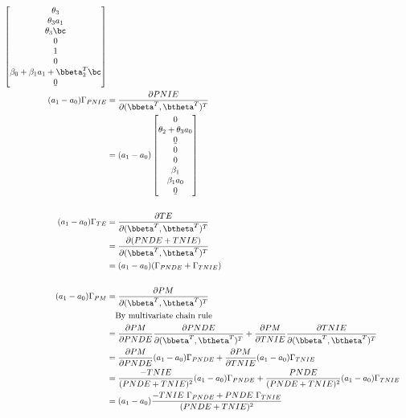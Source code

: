 \documentclass[dvipdfmx,10pt]{article}
\begin{document}
\begin{align*}
\begin{bmatrix}
      \theta_{3}\\
      \theta_{3}a_{1}\\
      \theta_{3}\bc\\
      0\\
      1\\
      0\\
      \beta_{0} + \beta_{1}a_{1} + \bbeta_{2}^{T}\bc\\
      \b0\\
    \end{bmatrix}\\
  (a_{1}-a_{0})\Gamma_{PNIE}
  &= \frac{\partial PNIE}{\partial (\bbeta^{T},\btheta^{T})^{T}}\\
  &= (a_{1}-a_{0})
    \begin{bmatrix}
      0\\
      \theta_{2} + \theta_{3}a_{0}\\
      \b0\\
      0\\
      0\\
      \beta_{1}\\
      \beta_{1}a_{0}\\
      \b0\\
    \end{bmatrix}\\
  \\
  (a_{1}-a_{0})\Gamma_{TE}
  &= \frac{\partial TE}{\partial (\bbeta^{T},\btheta^{T})^{T}}\\
  &= \frac{\partial (PNDE+TNIE)}{\partial (\bbeta^{T},\btheta^{T})^{T}}\\
  &= (a_{1}-a_{0})(\Gamma_{PNDE} + \Gamma_{TNIE})\\
  \\
  (a_{1}-a_{0})\Gamma_{PM}
  &= \frac{\partial PM}{\partial (\bbeta^{T},\btheta^{T})^{T}}\\
  &~~~\text{By multivariate chain rule}\\
  &= \frac{\partial PM}{\partial PNDE}\frac{\partial PNDE}{\partial (\bbeta^{T},\btheta^{T})^{T}} + \frac{\partial PM}{\partial TNIE}\frac{\partial TNIE}{\partial (\bbeta^{T},\btheta^{T})^{T}}\\
  &= \frac{\partial PM}{\partial PNDE}(a_{1}-a_{0})\Gamma_{PNDE} + \frac{\partial PM}{\partial TNIE}(a_{1}-a_{0})\Gamma_{TNIE}\\
  &= \frac{-TNIE}{(PNDE+TNIE)^{2}}(a_{1}-a_{0})\Gamma_{PNDE} + \frac{PNDE}{(PNDE+TNIE)^{2}}(a_{1}-a_{0})\Gamma_{TNIE}\\
  &= (a_{1}-a_{0}) \frac{-TNIE~\Gamma_{PNDE} + PNDE~\Gamma_{TNIE}}{(PNDE+TNIE)^{2}}\\
\end{align*}
\end{document}
